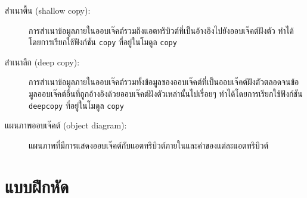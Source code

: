 \begin{description}
\item[สำเนาตื้น (shallow copy):] การสำเนาข้อมูลภายในออบเจ๊คต์รวมถึงแอตทริบิวต์ที่เป็นอ้างอิงไปยังออบเจ๊คต์ฝังตัว
ทำได้โดยการเรียกใช้ฟังก์ชัน {\tt copy} ที่อยู่ในโมดูล {\tt copy}


\item[สำเนาลึก (deep copy):] การสำเนาข้อมูลภายในออบเจ๊คต์รวมทั้งข้อมูลของออบเจ๊คต์ที่เป็นออบเจ๊คต์ฝังตัวตลอดจนข้อมูลออบเจ๊คต์อื่นที่ถูกอ้างอิงด้วยออบเจ๊คต์ฝังตัวเหล่านั้นไปเรื่อยๆ 
ทำได้โดยการเรียกใช้ฟังก์ชัน {\tt deepcopy} ที่อยู่ในโมดูล {\tt copy}


\item[แผนภาพออบเจ๊คต์ (object diagram):] แผนภาพที่มีการแสดงออบเจ๊คต์กับแอตทริบิวต์ภายในและค่าของแต่ละแอตทริบิวต์

\end{description}


\section{แบบฝึกหัด}

